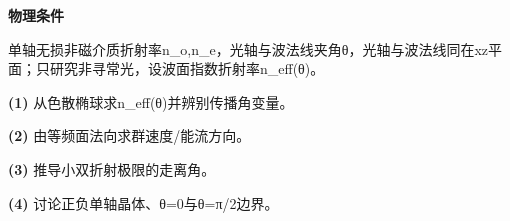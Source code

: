 \textbf{物理条件}\par 单轴无损非磁介质折射率n\_o,n\_e，光轴与波法线夹角θ，光轴与波法线同在xz平面；只研究非寻常光，设波面指数折射率n\_eff(θ)。
\par\noindent\textbf{(1)} 从色散椭球求n\_eff(θ)并辨别传播角变量。
\par\noindent\textbf{(2)} 由等频面法向求群速度/能流方向。
\par\noindent\textbf{(3)} 推导小双折射极限的走离角。
\par\noindent\textbf{(4)} 讨论正负单轴晶体、θ=0与θ=π/2边界。
